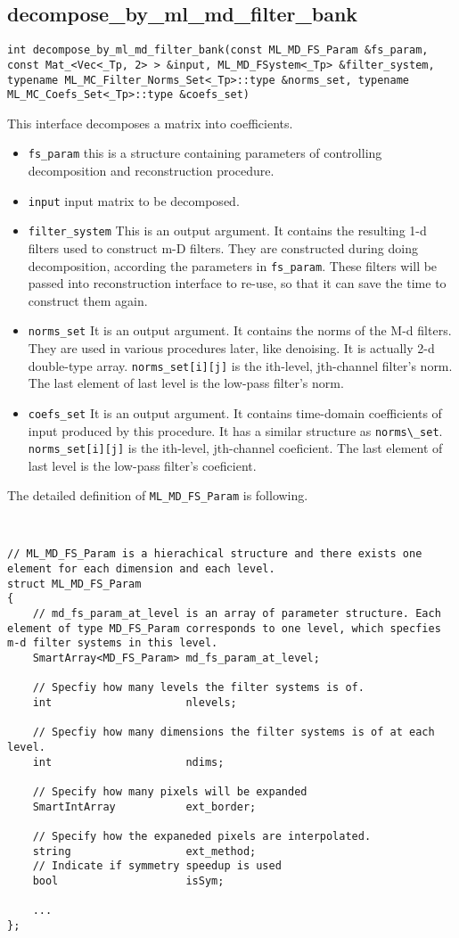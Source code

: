 \documentclass[a4paper,5pt]{article}
\begin{document}
\subsection{decompose\_by\_ml\_md\_filter\_bank}

\lstinline {int decompose_by_ml_md_filter_bank(const ML_MD_FS_Param &fs_param, const Mat_<Vec<_Tp, 2> > &input, ML_MD_FSystem<_Tp> &filter_system, typename ML_MC_Filter_Norms_Set<_Tp>::type &norms_set, typename ML_MC_Coefs_Set<_Tp>::type &coefs_set) }

This interface decomposes a matrix into coefficients.
\begin{itemize}
\item \lstinline{fs_param} this is a structure containing parameters of controlling decomposition and reconstruction procedure.
\item \lstinline{input} input matrix to be decomposed.
\item \lstinline{filter_system}  This is an output argument. It contains the resulting 1-d filters used to construct m-D filters. They are constructed during doing decomposition, according the parameters in \lstinline{fs_param}. These filters will be passed into reconstruction interface to re-use, so that it can save the time to construct them again.
\item \lstinline{norms_set} It is an output argument. It contains the norms of the M-d filters. They are used in various procedures later, like denoising. It is actually 2-d double-type array. \lstinline{norms_set[i][j]} is the ith-level, jth-channel filter's norm. The last element of last level is the low-pass filter's norm.
\item \lstinline{coefs_set} It is an output argument. It contains time-domain coefficients of input produced by this procedure. It has a similar structure as \lstinline{norms\_set}. \lstinline{norms_set[i][j]} is the ith-level, jth-channel coeficient. The last element of last level is the low-pass filter's coeficient.
\end{itemize}

  
  The detailed definition of \lstinline{ML_MD_FS_Param} is following.
\begin{lstlisting}


// ML_MD_FS_Param is a hierachical structure and there exists one element for each dimension and each level.
struct ML_MD_FS_Param
{
	// md_fs_param_at_level is an array of parameter structure. Each element of type MD_FS_Param corresponds to one level, which specfies m-d filter systems in this level.
	SmartArray<MD_FS_Param> md_fs_param_at_level;
	
	// Specfiy how many levels the filter systems is of.
	int 					nlevels;
	
	// Specfiy how many dimensions the filter systems is of at each level.
	int 					ndims;
	
	// Specify how many pixels will be expanded
	SmartIntArray			ext_border;
	
	// Specify how the expaneded pixels are interpolated.
	string					ext_method;
	// Indicate if symmetry speedup is used
	bool 					isSym;
	
	...
};
\end{lstlisting}
\end{document}

